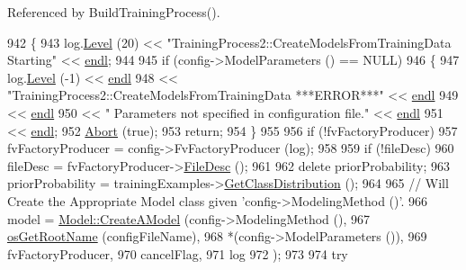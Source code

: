 Referenced by Build\+Training\+Process().


\begin{DoxyCode}
942 \{
943   log.\hyperlink{class_k_k_b_1_1_run_log_a32cf761d7f2e747465fd80533fdbb659}{Level} (20) << \textcolor{stringliteral}{"TrainingProcess2::CreateModelsFromTrainingData    Starting"} << 
      \hyperlink{namespace_k_k_b_ad1f50f65af6adc8fa9e6f62d007818a8}{endl};
944 
945   \textcolor{keywordflow}{if}  (config->ModelParameters () == NULL)
946   \{
947     log.\hyperlink{class_k_k_b_1_1_run_log_a32cf761d7f2e747465fd80533fdbb659}{Level} (-1) << \hyperlink{namespace_k_k_b_ad1f50f65af6adc8fa9e6f62d007818a8}{endl} 
948                    << \textcolor{stringliteral}{"TrainingProcess2::CreateModelsFromTrainingData    ***ERROR***"}  << 
      \hyperlink{namespace_k_k_b_ad1f50f65af6adc8fa9e6f62d007818a8}{endl}
949                    << \hyperlink{namespace_k_k_b_ad1f50f65af6adc8fa9e6f62d007818a8}{endl}
950                    << \textcolor{stringliteral}{"                   Parameters not specified in configuration file."} << 
      \hyperlink{namespace_k_k_b_ad1f50f65af6adc8fa9e6f62d007818a8}{endl}
951                    << \hyperlink{namespace_k_k_b_ad1f50f65af6adc8fa9e6f62d007818a8}{endl};
952     \hyperlink{class_k_k_m_l_l_1_1_training_process2_a5e5fad4ad447c8fdb38ab59da4c17aff}{Abort} (\textcolor{keyword}{true});
953     \textcolor{keywordflow}{return};
954   \}
955 
956   \textcolor{keywordflow}{if}  (!fvFactoryProducer)
957     fvFactoryProducer = config->FvFactoryProducer (log);
958 
959   \textcolor{keywordflow}{if}  (!fileDesc)
960     fileDesc = fvFactoryProducer->\hyperlink{class_k_k_m_l_l_1_1_factory_f_v_producer_ab2dea2e51cf9d6a109b52300619e185c}{FileDesc} ();
961 
962   \textcolor{keyword}{delete}  priorProbability;
963   priorProbability = trainingExamples->\hyperlink{class_k_k_m_l_l_1_1_feature_vector_list_a74ce131e68cdd499cf10d10c0573065e}{GetClassDistribution} ();
964 
965   \textcolor{comment}{// Will Create the Appropriate Model class given 'config->ModelingMethod ()'.}
966   model = \hyperlink{class_k_k_m_l_l_1_1_model_aab11308554985f9028773347aa185043}{Model::CreateAModel} (config->ModelingMethod (),
967                                \hyperlink{namespace_k_k_b_af5b668ed9902d7f93b62529664a739f0}{osGetRootName} (configFileName),
968                                *(config->ModelParameters ()), 
969                                fvFactoryProducer, 
970                                cancelFlag, 
971                                log
972                               );
973 
974   \textcolor{keywordflow}{try}

\end{DoxyCode}
